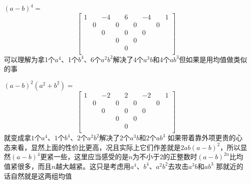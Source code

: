 \documentclass[UTF8]{ctexart}
\begin{document}
$ (a-b)^{4}= $
\renewcommand*{\arraystretch}{1.732}\[\left[\begin{matrix}
	1& &-4& &6& &-4& &1\\
	&0& &0& &0& &0&\\
	& &0& &0& &0& &\\
	& & &0& &0& & &\\
	& & & &0& & & &\\
\end{matrix}\right]\]
可以理解为拿1个$ a^{4} $、1个$ b^{4} $、6个$ a^{2}b^{2} $解决了4个$ a^{3}b $和4个$ ab^{3} $但如果是用均值做类似的事

$ (a-b)^{2}(a^{2}+b^{2})= $
\renewcommand*{\arraystretch}{1.732}\[\left[\begin{matrix}
	1& &-2& &2& &-2& &1\\
	&0& &0& &0& &0&\\
	& &0& &0& &0& &\\
	& & &0& &0& & &\\
	& & & &0& & & &\\
\end{matrix}\right]\]
就变成拿$ 1 $个$ a^{4} $、$ 1 $个$ b^{4} $、$ 2 $个$ a^{2}b^{2} $解决了$ 2 $个$ a^{3}b $和2个$ ab^{3} $
如果带着靠外项更贵的心态来看，显然上面的性价比更高，况且实际上它们作差就是$ 2ab(a-b)^{2} $，所以显然$ (a-b)^{4} $更紧一些，这里应当感受的是$ n $为不小于$ 2 $的正整数时$ (a-b)^{2n} $比均值紧很多，而且$ n $越大越紧。这只是考虑用$ a^{4} $、$ b^{4} $、$ a^{2}b^{2} $去攻击$ a^{3}b $和$ ab^{3} $
那就近的话自然就是这两组均值\\
\end{document}
